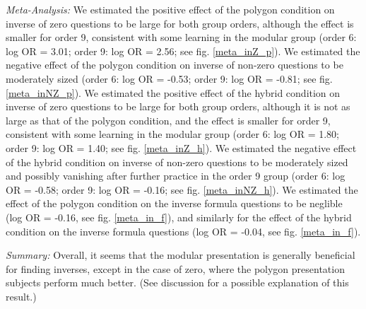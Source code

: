 \documentclass[man,10pt]{apa6}
\begin{document}
\textit{Meta-Analysis:} We estimated the positive effect of the polygon condition on inverse of zero questions to be large for both group orders, although the effect is smaller for order 9, consistent with some learning in the modular group (order 6: log OR = 3.01; order 9: log OR = 2.56; see fig. \ref{meta_inZ_p}). We estimated the negative effect of the polygon condition on inverse of non-zero questions to be moderately sized (order 6: log OR = -0.53; order 9: log OR = -0.81; see fig. \ref{meta_inNZ_p}). We estimated the positive effect of the hybrid condition on inverse of zero questions to be large for both group orders, although it is not as large as that of the polygon condition, and the effect is smaller for order 9, consistent with some learning in the modular group (order 6: log OR = 1.80; order 9: log OR = 1.40; see fig. \ref{meta_inZ_h}). We estimated the negative effect of the hybrid condition on inverse of non-zero questions to be moderately sized and possibly vanishing after further practice in the order 9 group (order 6: log OR = -0.58; order 9: log OR = -0.16; see fig. \ref{meta_inNZ_h}). We estimated the effect of the polygon condition on the inverse formula questions to be neglible (log OR = -0.16, see fig. \ref{meta_in_f}), and similarly for the effect of the hybrid condition on the inverse formula questions (log OR = -0.04, see fig. \ref{meta_in_f}). \par
\textit{Summary:} Overall, it seems that the modular presentation is generally beneficial for finding inverses, except in the case of zero, where the polygon presentation subjects perform much better. (See discussion for a possible explanation of this result.) 
\FloatBarrier
\end{document}
